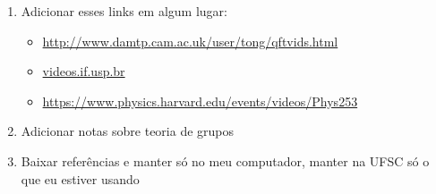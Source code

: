 \begin{enumerate}
\item Adicionar esses links em algum lugar:
	\begin{itemize}
		\item \url{http://www.damtp.cam.ac.uk/user/tong/qftvids.html}
		\item \url{videos.if.usp.br}
		\item \url{https://www.physics.harvard.edu/events/videos/Phys253}
	\end{itemize}
\item Adicionar notas sobre teoria de grupos

\item Baixar referências e manter só no meu computador, manter na UFSC só o que eu estiver usando
\end{enumerate}
